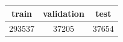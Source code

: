 \begin{tabular}{ccc}
\toprule
train & validation & test \\
\midrule
293537 & 37205 & 37654 \\
\bottomrule
\end{tabular}
